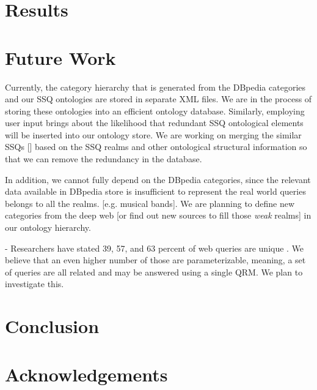 \section{Results}

\section{Future Work}

Currently, the category hierarchy that is generated from the DBpedia categories and our SSQ ontologies are stored in separate XML files. We are in the process of storing these ontologies into an efficient ontology database. Similarly, employing user input brings about the likelihood that redundant SSQ ontological elements will be inserted into our ontology store. We are working on merging the similar SSQs [\label{sec:ssq}] based on the SSQ realms and other ontological structural information so that we can remove the redundancy in the database.

In addition, we cannot fully depend on the DBpedia categories, since the relevant data available in DBpedia store is insufficient to represent the real world queries belongs to all the realms. [e.g. musical bands]. We are planning to define new categories from the deep web [or find out new sources to fill those \textit{weak} realms] in our ontology hierarchy.      

- Researchers have stated 39, 57, and 63 percent of web queries are unique \cite{1277770,331405,621942}.  We believe that an even higher number of those are parameterizable, meaning, a set of queries are all related and may be answered using a single QRM.  We plan to investigate this.


\section{Conclusion}

\section{Acknowledgements}
